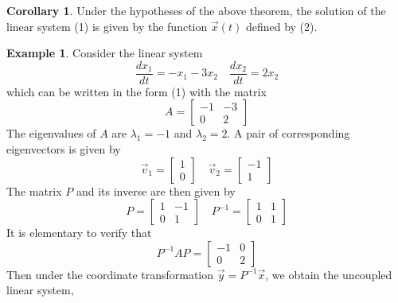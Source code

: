 \documentclass[11pt]{book}
\theoremstyle{definition}\newtheorem{definition}[subsection]{Definition}
\theoremstyle{definition}\newtheorem{example}[subsection]{Example}
\theoremstyle{definition}\newtheorem{notation}[subsection]{Notation}
\theoremstyle{definition}\newtheorem{remark}[subsection]{Remark}
\theoremstyle{theorem}\newtheorem{theorem}[subsection]{Theorem}
\theoremstyle{theorem}\newtheorem{lemma}[subsection]{Lemma}
\theoremstyle{theorem}\newtheorem{proposition}[subsection]{Proposition}
\theoremstyle{theorem}\newtheorem{corollary}[subsection]{Corollary}
\theoremstyle{theorem}\newtheorem{case}{Case}
\theoremstyle{remark}\newtheorem{subcase}{Subcase}[case]
\begin{document}
\begin{corollary}\label{corollary:1.3.2}
    Under the hypotheses of the above theorem, the solution of the linear system (1) is given by the function $\vec{x}(t)$ defined by (2).
\end{corollary}

\begin{example}\label{example:1.3.3}
    Consider the linear system
    \begin{equation*}
        \frac{dx_1}{dt} = -x_1 - 3x_2 \quad \frac{dx_2}{dt} = 2x_2
    \end{equation*}
    which can be written in the form (1) with the matrix
    \begin{equation*}
        A = \begin{bmatrix}
            -1 & -3 \\
            0 & 2
        \end{bmatrix}
    \end{equation*}
    The eigenvalues of $A$ are $\lambda_1 = -1$ and $\lambda_2 = 2$. A pair of corresponding eigenvectors is given by
    \begin{equation*}
        \vec{v}_1 = \begin{bmatrix} 1 \\ 0 \end{bmatrix} \quad 
        \vec{v}_2 = \begin{bmatrix} -1 \\ 1 \end{bmatrix}
    \end{equation*}
    The matrix $P$ and its inverse are then given by
    \begin{equation*}
        P = \begin{bmatrix} 1 & -1 \\ 0 & 1 \end{bmatrix} \quad P^{-1} = \begin{bmatrix} 1 & 1 \\ 0 & 1 \end{bmatrix}
    \end{equation*}
    It is elementary to verify that
    \begin{equation*}
        P^{-1}AP = \begin{bmatrix} -1 & 0 \\ 0 & 2 \end{bmatrix}
    \end{equation*}
    Then under the coordinate transformation $\vec{y} = P^{-1}\vec{x}$, we obtain the uncoupled linear system,
    \begin{align*}

\end{align*}
\end{example}
\end{document}
